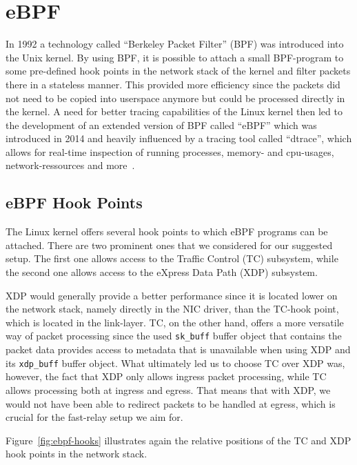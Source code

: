 \section{eBPF}\label{sec:ebpf_bg}
In 1992 a technology called ``Berkeley Packet Filter'' (BPF) was introduced into 
the Unix kernel.
By using BPF, it is possible to attach a small BPF-program to some pre-defined hook points in 
the network stack of the kernel and filter packets there in a stateless manner.
This provided more efficiency since the packets did not need to be copied into 
userspace anymore but could be processed directly in the kernel.
A need for better tracing capabilities of the Linux kernel then led to the development 
of an extended version of BPF called ``eBPF'' which was introduced in 2014 and 
heavily influenced by a tracing tool called ``dtrace'', which allows for 
real-time inspection of running processes, memory- and cpu-usages, network-ressources 
and more~\parencite{ebpf-intro-tigera}.

\subsection{eBPF Hook Points}
The Linux kernel offers several hook points to which eBPF programs can be attached.
There are two prominent ones that we considered for our suggested setup.
The first one allows access to the Traffic Control (TC) subsystem, while the 
second one allows access to the eXpress Data Path (XDP) subsystem.

XDP would generally provide a better performance since it is located 
lower on the network stack, namely directly in the NIC driver, than the 
TC-hook point, which is located in the link-layer.
TC, on the other hand, offers a more versatile way of packet processing since 
the used \verb|sk_buff| buffer object that contains the packet data provides access to 
metadata that is unavailable when using XDP and its \verb|xdp_buff| buffer object.
What ultimately led us to choose TC over XDP was, however, the fact that 
XDP only allows ingress packet processing, while TC allows processing both
at ingress and egress.
That means that with XDP, we would not have been able to redirect packets to be handled 
at egress, which is crucial for the fast-relay setup we aim for. %

Figure~\autoref{fig:ebpf-hooks} illustrates again the relative positions of the TC and
XDP hook points in the network stack.

